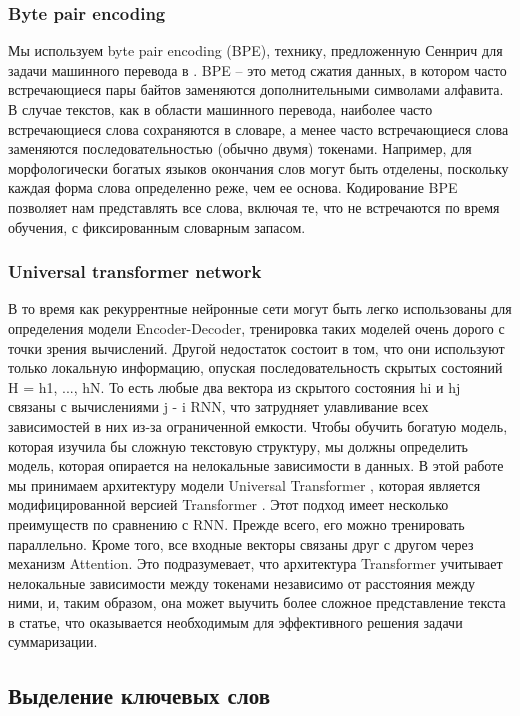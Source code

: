 \documentclass[aps,%
12pt,%
final,%
oneside,
onecolumn,%
musixtex, %
superscriptaddress,%
centertags]{article} %
\begin{document}
\subsubsection{Byte pair encoding}

Мы используем byte pair encoding (BPE), технику, предложенную Сеннрич для задачи машинного перевода в \cite{DBLP:journals/corr/SennrichHB15}. BPE -- это метод сжатия данных, в котором часто встречающиеся пары байтов заменяются дополнительными символами алфавита. В случае текстов, как в области машинного перевода, наиболее часто встречающиеся слова сохраняются в словаре, а менее часто встречающиеся слова заменяются последовательностью (обычно двумя) токенами. Например, для морфологически богатых языков окончания слов могут быть отделены, поскольку каждая форма слова определенно реже, чем ее основа. Кодирование BPE позволяет нам представлять все слова, включая те, что не встречаются по время обучения, с фиксированным словарным запасом.

\subsubsection{Universal transformer network}
В то время как рекуррентные нейронные сети могут быть легко использованы для определения модели Encoder-Decoder, тренировка таких моделей очень дорого с точки зрения вычислений. Другой недостаток состоит в том, что они используют только локальную информацию, опуская последовательность скрытых состояний H = {h1, ..., hN}. То есть любые два вектора из скрытого состояния hi и hj связаны с вычислениями j - i RNN, что затрудняет улавливание всех зависимостей в них из-за ограниченной емкости. Чтобы обучить богатую модель, которая изучила бы сложную текстовую структуру, мы должны определить модель, которая опирается на нелокальные зависимости в данных.
В этой работе мы принимаем архитектуру модели Universal Transformer \cite{}, которая является модифицированной версией Transformer \cite{}. Этот подход имеет несколько преимуществ по сравнению с RNN. Прежде всего, его можно тренировать параллельно. Кроме того, все входные векторы связаны друг с другом через механизм Attention. Это подразумевает, что архитектура Transformer учитывает нелокальные зависимости между токенами независимо от расстояния между ними, и, таким образом, она может выучить более сложное представление текста в статье, что оказывается необходимым для эффективного решения задачи суммаризации.

\subsection{Выделение ключевых слов}
\end{document}
